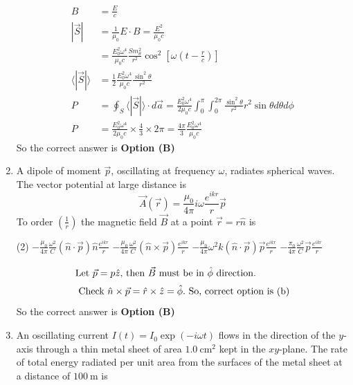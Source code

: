 \begin{enumerate}
\begin{answer}
	\begin{align*}
	B&=\frac{E}{c}\\
	|\vec{S}|&=\frac{1}{\mu_{0}} E \cdot B=\frac{E^{2}}{\mu_{0} c}\\&=\frac{E_{0}^{2} \omega^{4}}{\mu_{0} c} \frac{S m_{\theta}^{2}}{r^{2}} \cos ^{2}\left[\omega\left(t-\frac{r}{c}\right)\right]\\
	\langle|\vec{S}|\rangle&=\frac{1}{2} \frac{E_{0}^{2} \omega^{4}}{\mu_{0} c} \frac{\sin ^{2} \theta}{r^{2}}\\
	P&=\oint_{S}\langle|\vec{S}|\rangle \cdot d \vec{a}=\frac{E_{0}^{2} \omega^{4}}{2 \mu_{0} c} \int_{0}^{\pi} \int_{0}^{2 \pi} \frac{\sin ^{2} \theta}{r^{2}} r^{2} \sin \theta d \theta d \phi\\
	P&=\frac{E_{0}^{2} \omega^{4}}{2 \mu_{0} c} \times \frac{4}{3} \times 2 \pi=\frac{4 \pi}{3} \frac{E_{0}^{2} \omega^{4}}{\mu_{0} c}
	\end{align*}
	So the correct answer is \textbf{Option (B)}
\end{answer}
	\item  A dipole of moment $\vec{p}$, oscillating at frequency $\omega$, radiates spherical waves. The vector potential at large distance is
	$$
	\vec{A}(\vec{r})=\frac{\mu_{0}}{4 \pi} i \omega \frac{e^{i k r}}{r} \vec{p}
	$$
	To order $\left(\frac{1}{r}\right)$ the magnetic field $\vec{B}$ at a point $\vec{r}=r \hat{n}$ is
	{}
	\begin{tasks}(2)
		\task[\textbf{a.}]$-\frac{\mu_{0}}{4 \pi} \frac{\omega^{2}}{C}(\hat{n} \cdot \vec{p}) \hat{n} \frac{e^{i k r}}{r}$
		\task[\textbf{b.}] $-\frac{\mu_{0}}{4 \pi} \frac{\omega^{2}}{C}(\hat{n} \times \vec{p}) \frac{e^{i k r}}{r}$
		\task[\textbf{c.}] $-\frac{\mu_{0}}{4 \pi} \omega^{2} k(\hat{n} \cdot \vec{p}) \vec{p} \frac{e^{i k r}}{r}$
		\task[\textbf{d.}] $-\frac{\pi_{0}}{4 \pi} \frac{\omega^{2}}{C} \vec{p} \frac{e^{i k r}}{r}$
	\end{tasks}
\begin{answer}
	\begin{align*}
	\intertext{Let $\vec{p}=p \hat{z}$, then $\vec{B}$ must be in $\hat{\phi}$ direction.}
	\intertext{ Check $\hat{n} \times \vec{p}=\hat{r} \times \hat{z}=\hat{\phi} .$ So, correct option is (b)}
	\end{align*}
	So the correct answer is \textbf{Option (B)}
\end{answer}
	\item  An oscillating current $I(t)=I_{0} \exp (-i \omega t)$ flows in the direction of the $y$-axis through a thin metal sheet of area $1.0 \mathrm{~cm}^{2}$ kept in the $x y$-plane. The rate of total energy radiated per unit area from the surfaces of the metal sheet at a distance of $100 \mathrm{~m}$ is

\end{enumerate}
